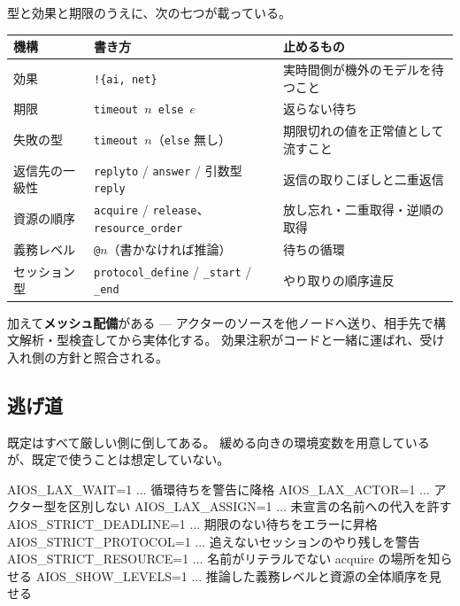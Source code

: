 \documentclass[11pt,a4paper]{ltjsarticle}
\theoremstyle{definition}
\theoremstyle{remark}
\begin{document}
型と効果と期限のうえに、次の七つが載っている。

\begin{center}
\small
\begin{tabular}{p{}p{}p{}}
\toprule
機構 & 書き方 & 止めるもの \\
\midrule
効果 & \texttt{!\{ai, net\}} & 実時間側が機外のモデルを待つこと \\
期限 & \texttt{timeout $n$ else $e$} & 返らない待ち \\
失敗の型 & \texttt{timeout $n$}（\texttt{else} 無し） & 期限切れの値を正常値として流すこと \\
返信先の一級性 & \texttt{replyto} / \texttt{answer} / 引数型 \texttt{reply} & 返信の取りこぼしと二重返信 \\
資源の順序 & \texttt{acquire} / \texttt{release}、\texttt{resource\_order} & 放し忘れ・二重取得・逆順の取得 \\
義務レベル & \texttt{@$n$}（書かなければ推論） & 待ちの循環 \\
セッション型 & \texttt{protocol\_define} / \texttt{\_start} / \texttt{\_end} & やり取りの順序違反 \\
\bottomrule
\end{tabular}
\end{center}

加えて\textbf{メッシュ配備}がある ---
アクターのソースを他ノードへ送り、相手先で構文解析・型検査してから実体化する。
効果注釈がコードと一緒に運ばれ、受け入れ側の方針と照合される。

\subsection{逃げ道}

既定はすべて厳しい側に倒してある。
緩める向きの環境変数を用意しているが、既定で使うことは想定していない。

\begin{term}
AIOS_LAX_WAIT=1        ... 循環待ちを警告に降格
AIOS_LAX_ACTOR=1       ... アクター型を区別しない
AIOS_LAX_ASSIGN=1      ... 未宣言の名前への代入を許す
AIOS_STRICT_DEADLINE=1 ... 期限のない待ちをエラーに昇格
AIOS_STRICT_PROTOCOL=1 ... 追えないセッションのやり残しを警告
AIOS_STRICT_RESOURCE=1 ... 名前がリテラルでない acquire の場所を知らせる
AIOS_SHOW_LEVELS=1     ... 推論した義務レベルと資源の全体順序を見せる
\end{term}

\end{document}
